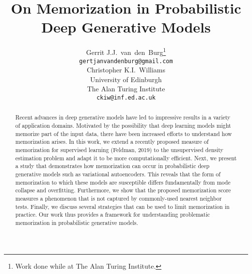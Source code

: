 \documentclass{article}
\title{On Memorization in Probabilistic\\ Deep Generative Models}
\author{%
	Gerrit J.J.~van~den~Burg\thanks{Work done while at The Alan Turing 
		Institute.} \\
	\texttt{gertjanvandenburg@gmail.com} \\
	\And
	Christopher K.I.~Williams \\
	University of Edinburgh \\
	The Alan Turing Institute \\
	\texttt{ckiw@inf.ed.ac.uk}
}
\begin{document}
\maketitle

\begin{abstract}
	Recent advances in deep generative models have led to impressive 
	results in a variety of application domains. Motivated by the 
	possibility that deep learning models might memorize part of the input 
	data, there have been increased efforts to understand how memorization 
	arises. In this work, we extend a recently proposed measure of 
	memorization for supervised learning (Feldman, 2019) to the 
	unsupervised density estimation problem and adapt it to be more 
	computationally efficient. Next, we present a study that demonstrates 
	how memorization can occur in probabilistic deep generative models 
	such as variational autoencoders. This reveals that the form of 
	memorization to which these models are susceptible differs 
	fundamentally from mode collapse and overfitting. Furthermore, we show 
	that the proposed memorization score measures a phenomenon that is not 
	captured by commonly-used nearest neighbor tests. Finally, we discuss 
	several strategies that can be used to limit memorization in practice.  
	Our work thus provides a framework for understanding problematic 
	memorization in probabilistic generative models.
\end{abstract}

\end{document}

